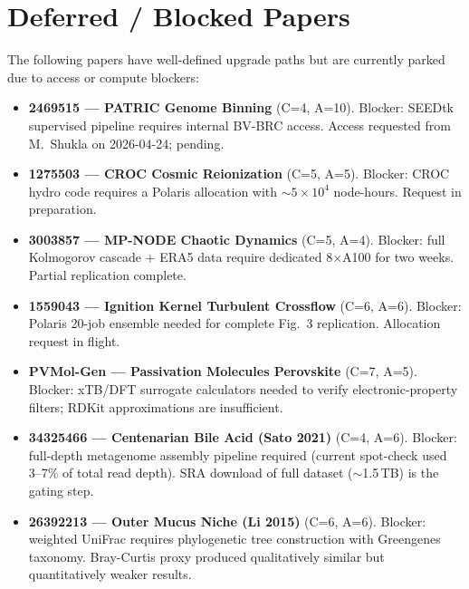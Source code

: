 \section{Deferred / Blocked Papers}\label{sec:deferred}

The following papers have well-defined upgrade paths but are currently
parked due to access or compute blockers:

\begin{itemize}[leftmargin=1.4em,itemsep=0.3em]
\item \textbf{2469515 --- PATRIC Genome Binning} (C=4, A=10).
  Blocker: SEEDtk supervised pipeline requires internal BV-BRC access.
  Access requested from M.~Shukla on 2026-04-24; pending.

\item \textbf{1275503 --- CROC Cosmic Reionization} (C=5, A=5).
  Blocker: CROC hydro code requires a Polaris allocation with $\sim$$5 \times 10^4$
  node-hours. Request in preparation.

\item \textbf{3003857 --- MP-NODE Chaotic Dynamics} (C=5, A=4).
  Blocker: full Kolmogorov cascade + ERA5 data require dedicated
  8$\times$A100 for two weeks. Partial replication complete.

\item \textbf{1559043 --- Ignition Kernel Turbulent Crossflow} (C=6, A=6).
  Blocker: Polaris 20-job ensemble needed for complete Fig.~3 replication.
  Allocation request in flight.

\item \textbf{PVMol-Gen --- Passivation Molecules Perovskite} (C=7, A=5).
  Blocker: xTB/DFT surrogate calculators needed to verify electronic-property
  filters; RDKit approximations are insufficient.

\item \textbf{34325466 --- Centenarian Bile Acid (Sato 2021)} (C=4, A=6).
  Blocker: full-depth metagenome assembly pipeline required (current
  spot-check used 3--7\% of total read depth). SRA download of full
  dataset ($\sim$1.5\,TB) is the gating step.

\item \textbf{26392213 --- Outer Mucus Niche (Li 2015)} (C=6, A=6).
  Blocker: weighted UniFrac requires phylogenetic tree construction with
  Greengenes taxonomy. Bray-Curtis proxy produced qualitatively similar but
  quantitatively weaker results.
\end{itemize}

